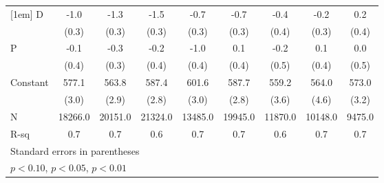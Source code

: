 \begin{table}[htbp]
\begin{tabular}{l*{8}{c}}
[1em]
D                   &        -1.0\sym{***}&        -1.3\sym{***}&        -1.5\sym{***}&        -0.7\sym{**} &        -0.7\sym{**} &        -0.4         &        -0.2         &         0.2         \\
                    &       (0.3)         &       (0.3)         &       (0.3)         &       (0.3)         &       (0.3)         &       (0.4)         &       (0.3)         &       (0.4)         \\
[1em]
P                   &        -0.1         &        -0.3         &        -0.2         &        -1.0\sym{**} &         0.1         &        -0.2         &         0.1         &         0.0         \\
                    &       (0.4)         &       (0.3)         &       (0.4)         &       (0.4)         &       (0.4)         &       (0.5)         &       (0.4)         &       (0.5)         \\
[1em]
Constant            &       577.1\sym{***}&       563.8\sym{***}&       587.4\sym{***}&       601.6\sym{***}&       587.7\sym{***}&       559.2\sym{***}&       564.0\sym{***}&       573.0\sym{***}\\
                    &       (3.0)         &       (2.9)         &       (2.8)         &       (3.0)         &       (2.8)         &       (3.6)         &       (4.6)         &       (3.2)         \\
\hline
N                   &     18266.0         &     20151.0         &     21324.0         &     13485.0         &     19945.0         &     11870.0         &     10148.0         &      9475.0         \\
R-sq                &         0.7         &         0.7         &         0.6         &         0.7         &         0.7         &         0.6         &         0.7         &         0.7         \\
\hline\hline
\multicolumn{9}{l}{\footnotesize Standard errors in parentheses}\\
\multicolumn{9}{l}{\footnotesize \sym{*} \(p<0.10\), \sym{**} \(p<0.05\), \sym{***} \(p<0.01\)}\\
\end{tabular}
\end{table}

